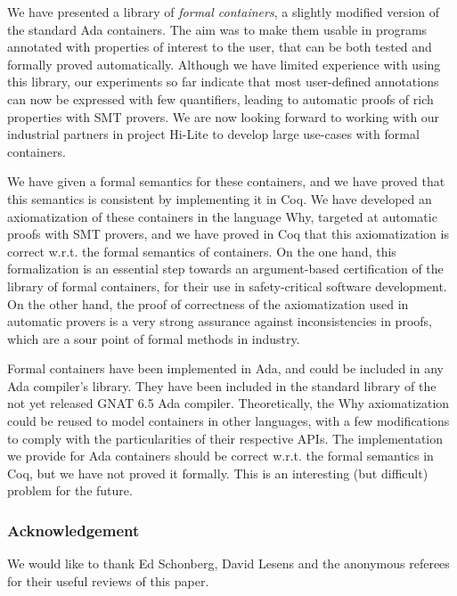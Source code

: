 \documentclass[runningheads,a4paper]{llncs}
\newcommand{\wrt}{w.r.t.\xspace}
\newcommand{\beforesec}{\vspace{-0.2cm}}
\begin{document}
We have presented a library of \textit{formal containers}, a slightly modified
version of the standard Ada containers. The aim was to make them usable in
programs annotated with properties of interest to the user, that can be both
tested and formally proved automatically.  Although we have limited experience
with using this library, our experiments so far indicate that most user-defined
annotations can now be expressed with few quantifiers, leading to automatic proofs of
rich properties with SMT provers. We are now looking forward to working
with our industrial partners in project Hi-Lite to develop large use-cases with
formal containers.

We have given a formal semantics for these containers, and we have proved that
this semantics is consistent by implementing it in Coq. We have developed an
axiomatization of these containers in the language Why, targeted at automatic
proofs with SMT provers, and we have proved in Coq that this axiomatization is
correct \wrt the formal semantics of containers. On the one hand, this
formalization is an essential step towards an argument-based certification of
the library of formal containers, for their use in safety-critical software
development. On the other hand, the proof of correctness of the axiomatization
used in automatic provers is a very strong assurance against inconsistencies in
proofs, which are a sour point of formal methods in industry.

Formal containers have been implemented in Ada, and could be included in any Ada
compiler's library.
They have been included in the standard library of the not yet released GNAT
6.5 Ada compiler.
Theoretically, the Why axiomatization could be reused to model containers in
other languages, with a few modifications to comply with the particularities of
their respective APIs.
%
The implementation we provide for Ada containers should be correct \wrt the
formal semantics in Coq, but we have not proved it formally. This is an
interesting (but difficult) problem for the future.

\subsubsection*{Acknowledgement}
We would like to thank Ed Schonberg, David Lesens and the anonymous referees
for their useful reviews of this paper.

\beforesec




\end{document}
